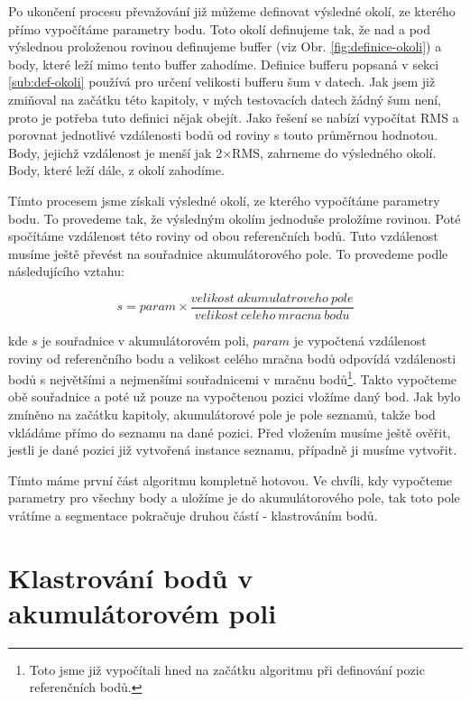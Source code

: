 \documentclass[11pt,twoside,a4paper]{book}
\begin{document}
Po ukončení procesu převažování již můžeme definovat výsledné okolí, ze kterého přímo vypočítáme parametry bodu. Toto okolí definujeme tak, že nad a pod výslednou proloženou rovinou definujeme buffer (viz Obr. \ref{fig:definice-okoli}) a body, které leží mimo tento buffer zahodíme. Definice bufferu popsaná v sekci \ref{sub:def-okoli} používá pro určení velikosti bufferu šum v datech. Jak jsem již zmiňoval na začátku této kapitoly, v mých testovacích datech žádný šum není, proto je potřeba tuto definici nějak obejít. Jako řešení se nabízí vypočítat RMS a porovnat jednotlivé vzdálenosti bodů od roviny s touto průměrnou hodnotou. Body, jejichž vzdálenost je menší jak 2$\times$RMS, zahrneme do výsledného okolí. Body, které leží dále, z okolí zahodíme. 

Tímto procesem jsme získali výsledné okolí, ze kterého vypočítáme parametry bodu. To provedeme tak, že výsledným okolím jednoduše proložíme rovinou. Poté spočítáme vzdálenost této roviny od obou referenčních bodů. Tuto vzdálenost musíme ještě převést na souřadnice akumulátorového pole. To provedeme podle následujícího vztahu:

\begin{equation}
s = param \times \frac{velikost~akumulatroveho~pole}{velikost~celeho~mracna~bodu}
\end{equation}

\noindent
kde $s$ je souřadnice v akumulátorovém poli, $param$ je vypočtená vzdálenost roviny od referenčního bodu a velikost celého mračna bodů odpovídá vzdálenosti bodů s největšími a nejmenšími souřadnicemi v mračnu bodů\footnote{Toto jsme již vypočítali hned na začátku algoritmu při definování pozic referenčních bodů.}. Takto vypočteme obě souřadnice a poté už pouze na vypočtenou pozici vložíme daný bod. Jak bylo zmíněno na začátku kapitoly, akumulátorové pole je pole seznamů, takže bod vkládáme přímo do seznamu na dané pozici. Před vložením musíme ještě ověřit, jestli je dané pozici již vytvořená instance seznamu, případně ji musíme vytvořit.

Tímto máme první část algoritmu kompletně hotovou. Ve chvíli, kdy vypočteme parametry pro všechny body a uložíme je do akumulátorového pole, tak toto pole vrátíme a segmentace pokračuje druhou částí - klastrováním bodů.


\section{Klastrování bodů v akumulátorovém poli}
\label{sub:seg1-klastrovani}
\end{document}
